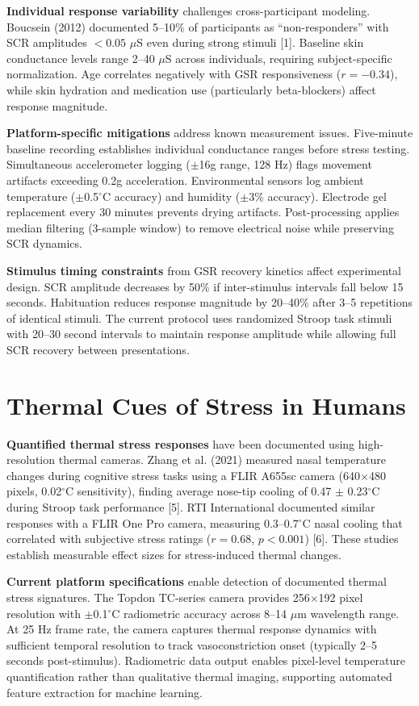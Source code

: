 \textbf{Individual response variability} challenges cross-participant modeling. Boucsein (2012) documented 5--10\% of participants as ``non-responders'' with SCR amplitudes $<0.05$ $\mu$S even during strong stimuli [1]. Baseline skin conductance levels range 2--40 $\mu$S across individuals, requiring subject-specific normalization. Age correlates negatively with GSR responsiveness ($r = -0.34$), while skin hydration and medication use (particularly beta-blockers) affect response magnitude.

\textbf{Platform-specific mitigations} address known measurement issues. Five-minute baseline recording establishes individual conductance ranges before stress testing. Simultaneous accelerometer logging ($\pm$16g range, 128 Hz) flags movement artifacts exceeding 0.2g acceleration. Environmental sensors log ambient temperature ($\pm$0.5$^\circ$C accuracy) and humidity ($\pm$3\% accuracy). Electrode gel replacement every 30 minutes prevents drying artifacts. Post-processing applies median filtering (3-sample window) to remove electrical noise while preserving SCR dynamics.

\textbf{Stimulus timing constraints} from GSR recovery kinetics affect experimental design. SCR amplitude decreases by 50\% if inter-stimulus intervals fall below 15 seconds. Habituation reduces response magnitude by 20--40\% after 3--5 repetitions of identical stimuli. The current protocol uses randomized Stroop task stimuli with 20--30 second intervals to maintain response amplitude while allowing full SCR recovery between presentations.

\section{Thermal Cues of Stress in Humans}
\textbf{Quantified thermal stress responses} have been documented using high-resolution thermal cameras. Zhang et al. (2021) measured nasal temperature changes during cognitive stress tasks using a FLIR A655sc camera (640$\times$480 pixels, 0.02$^\circ$C sensitivity), finding average nose-tip cooling of 0.47 $\pm$ 0.23$^\circ$C during Stroop task performance [5]. RTI International documented similar responses with a FLIR One Pro camera, measuring 0.3--0.7$^\circ$C nasal cooling that correlated with subjective stress ratings ($r = 0.68$, $p < 0.001$) [6]. These studies establish measurable effect sizes for stress-induced thermal changes.

\textbf{Current platform specifications} enable detection of documented thermal stress signatures. The Topdon TC-series camera provides 256$\times$192 pixel resolution with $\pm$0.1$^\circ$C radiometric accuracy across 8--14 $\mu$m wavelength range. At 25 Hz frame rate, the camera captures thermal response dynamics with sufficient temporal resolution to track vasoconstriction onset (typically 2--5 seconds post-stimulus). Radiometric data output enables pixel-level temperature quantification rather than qualitative thermal imaging, supporting automated feature extraction for machine learning.

